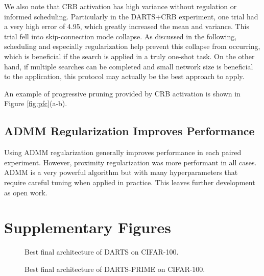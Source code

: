 \documentclass[letterpaper]{article} \usepackage{aaai22}  \usepackage{times}  \usepackage{helvet}  \usepackage{courier}  \usepackage[hyphens]{url}  \usepackage{graphicx} \urlstyle{rm} \def\UrlFont{\rm}  \usepackage{natbib}  \usepackage{caption} \DeclareCaptionStyle{ruled}{labelfont=normalfont,labelsep=colon,strut=off} \frenchspacing  \setlength{\pdfpagewidth}{8.5in}  \setlength{\pdfpageheight}{11in}  \usepackage{algorithm}
\begin{document}
We also note that CRB activation has high variance without regulation or informed scheduling. Particularly in the DARTS+CRB experiment, one trial had a very high error of 4.95, which greatly increased the mean and variance. This trial fell into skip-connection mode collapse. As discussed in the following, scheduling and especially regularization help prevent this collapse from occurring, which is beneficial if the search is applied in a truly one-shot task. On the other hand, if multiple searches can be completed and small network size is beneficial to the application, this protocol may actually be the best approach to apply.

An example of progressive pruning provided by CRB activation is shown in Figure \ref{fig:pfc}(a-b). 

\subsection{ADMM Regularization Improves Performance}

Using ADMM regularization generally improves performance in each paired experiment. However, proximity regularization was more performant in all cases. ADMM is a very powerful algorithm but with many hyperparameters that require careful tuning when applied in practice. This leaves further development as open work.

\section{Supplementary Figures}
\begin{figure}[thp!]
\centering
\begin{minipage}{.39\linewidth}
\centering
{}
\end{minipage}
\begin{minipage}{.59\linewidth}
\centering
{}
\end{minipage}
\caption{Best final architecture of DARTS on CIFAR-100.}
\label{fig:darts100plots}
\end{figure}


\begin{figure}[thp!]
\centering
\begin{minipage}{.49\linewidth}
\centering
{}
\end{minipage}
\begin{minipage}{.49\linewidth}
\centering
{}
\end{minipage}
\caption{Best final architecture of DARTS-PRIME on CIFAR-100.}
\label{fig:prime100plots}
\end{figure}
\end{document}
